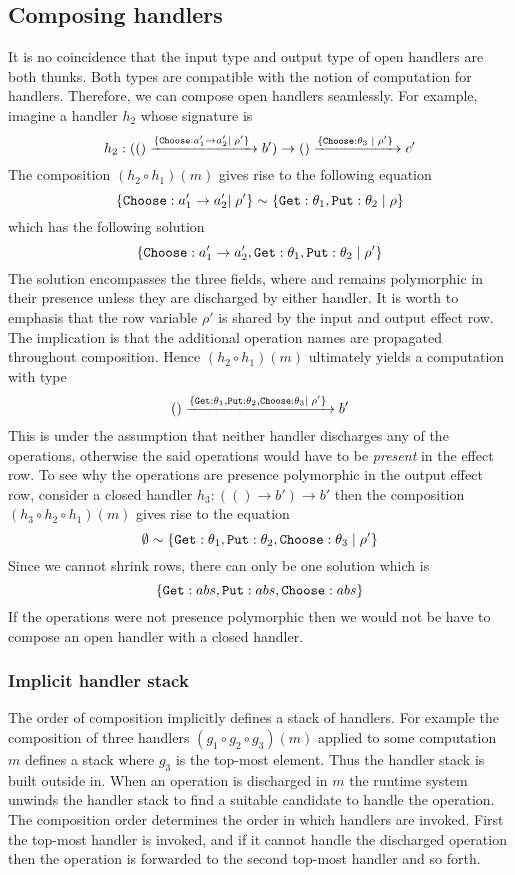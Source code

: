 \subsection{Composing handlers}
It is no coincidence that the input type and output type of open handlers are both thunks. Both types are compatible with the notion of computation for handlers. Therefore, we can compose open handlers seamlessly.
For example, imagine a handler $h_2$ whose signature is
\[ h_2 : (() \xrightarrow{ \{ \texttt{Choose}: a_1' \to a_2' | \; \rho' \}\; } b') \to () \xrightarrow{ \{ \texttt{Choose}: \theta_3 \; | \; \rho' \}\;} c' \]
The composition $(h_2 \circ h_1)(m)$ gives rise to the following equation
\[ \{ \texttt{Choose}: a_1' \to a_2' | \; \rho' \}\sim \{\texttt{Get}: \theta_1, \texttt{Put}: \theta_2 \; | \; \rho\} \]
which has the following solution
\[ \{ \texttt{Choose}: a_1' \to a_2', \texttt{Get}: \theta_1, \texttt{Put}: \theta_2 \; | \; \rho'\} \]
The solution encompasses the three fields, where  and  remains polymorphic in their presence unless they are discharged by either handler. It is worth to emphasis that the row variable $\rho'$ is shared by the input and output effect row. The implication is that the additional operation names are propagated throughout composition. Hence $(h_2 \circ h_1)(m)$ ultimately yields a computation with type
\[ () \xrightarrow{ \{ \texttt{Get}: \theta_1, \texttt{Put}: \theta_2, \texttt{Choose}: \theta_3 | \; \rho' \}\; } b' \]
This is under the assumption that neither handler discharges any of the operations, otherwise the said operations would have to be \emph{present} in the effect row.
To see why the operations are presence polymorphic in the output effect row, consider a closed handler $h_3 : (() \to b') \to b'$ then the composition $(h_3 \circ h_2 \circ h_1)(m)$ gives rise to the equation
\[ \emptyset \sim \{ \texttt{Get}: \theta_1, \texttt{Put}: \theta_2, \texttt{Choose}: \theta_3 \; | \; \rho'\} \]
Since we cannot shrink rows, there can only be one solution which is
\[ \{ \texttt{Get}: abs, \texttt{Put}: abs, \texttt{Choose}: abs \} \]
If the operations were not presence polymorphic then we would not be have to compose an open handler with a closed handler.

\subsubsection{Implicit handler stack}
The order of composition implicitly defines a stack of handlers. For example the composition of three handlers $(g_1 \circ g_2 \circ g_3)(m)$ applied to some computation $m$ defines a stack where $g_3$ is the top-most element. Thus the handler stack is built outside in. When an operation is discharged in $m$ the runtime system unwinds the handler stack to find a suitable candidate to handle the operation. The composition order determines the order in which handlers are invoked. First the top-most handler is invoked, and if it cannot handle the discharged operation then the operation is forwarded to the second top-most handler and so forth.


